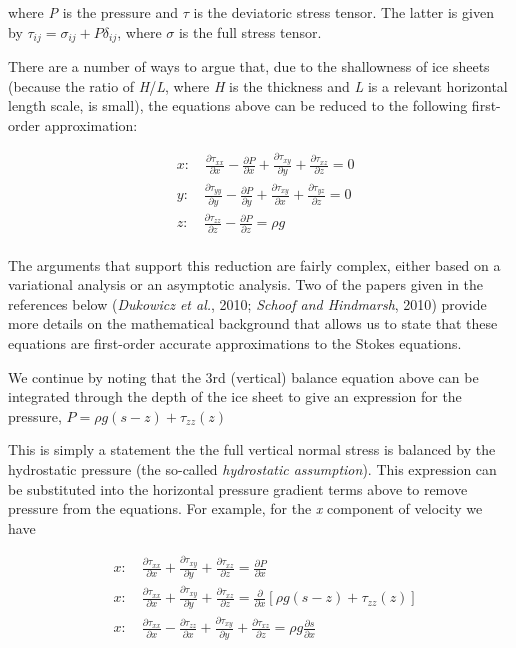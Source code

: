 where \textit{P} is the pressure and {\large \(\tau{}\)} is the deviatoric stress tensor. The latter is given by $\tau _{ij}=\sigma _{ij}+P\delta _{ij}$, 
where {\large \(\sigma{}\)} is the full stress tensor.

There are a number of ways to argue that, due to the shallowness of ice sheets (because the ratio of \textit{H}/\textit{L}, where \textit{H} is the thickness and \textit{L} is a relevant horizontal length scale, is small), the equations above can be reduced to the following first-order approximation:

\begin{align*}
  & x:\quad \frac{\partial \tau _{xx}}{\partial x}-\frac{\partial P}{\partial x}+\frac{\partial \tau _{xy}}{\partial y}+\frac{\partial \tau _{xz}}{\partial z}=0 \\ 
 & y:\quad \frac{\partial \tau _{yy}}{\partial y}-\frac{\partial P}{\partial y}+\frac{\partial \tau _{xy}}{\partial x}+\frac{\partial \tau _{yz}}{\partial z}=0 \\ 
 & z:\quad \frac{\partial \tau _{zz}}{\partial z}-\frac{\partial P}{\partial z}=\rho g \\ 
\end{align*}

The arguments that support this reduction are fairly complex, either based on a variational analysis or an asymptotic analysis. Two of the papers given in the references below ({\textit{Dukowicz et al.}, 2010}; {\textit{Schoof and Hindmarsh}, 2010}) provide more details on the mathematical background that allows us to state that these equations are first-order accurate approximations to the Stokes equations. 

We continue by noting that the 3rd (vertical) balance equation above can be integrated through the depth of the ice sheet to give an expression for the pressure, $P=\rho g\left( s-z \right)+\tau _{zz}(z)$

This is simply a statement the the full vertical normal stress is balanced by the hydrostatic pressure (the so-called \textit{hydrostatic assumption}). This expression can be substituted into the horizontal pressure gradient terms above to remove pressure from the equations. For example, for the \textit{x} component of velocity we have

\begin{align*}
  & x:\quad \frac{\partial \tau _{xx}}{\partial x}+\frac{\partial \tau _{xy}}{\partial y}+\frac{\partial \tau _{xz}}{\partial z}=\frac{\partial P}{\partial x} \\ 
 & x:\quad \frac{\partial \tau _{xx}}{\partial x}+\frac{\partial \tau _{xy}}{\partial y}+\frac{\partial \tau _{xz}}{\partial z}=\frac{\partial }{\partial x}\left[ \rho g\left( s-z \right)+\tau _{zz}(z) \right] \\ 
 & x:\quad \frac{\partial \tau _{xx}}{\partial x}-\frac{\partial \tau _{zz}}{\partial x}+\frac{\partial \tau _{xy}}{\partial y}+\frac{\partial \tau _{xz}}{\partial z}=\rho g\frac{\partial s}{\partial x} \\ 
\end{align*}


